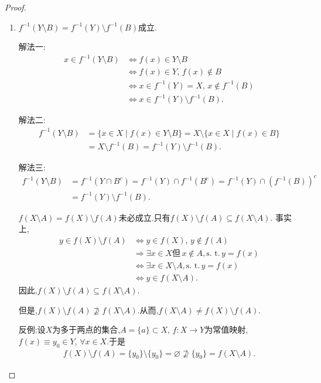 \documentclass[../../main.tex]{subfiles}%
\begin{document}
\begin{proof}
\begin{enumerate}[(1)]
反之, 假设 $f$ 不是单射, 则存在 $x_1 \neq x_2$ 使得 $f(x_1) = f(x_2)$. 构造集合 $A = \{x_1\}$, 则 $f(A) = \{f(x_1)\}$. 故 $\{x_1, x_2\} \subseteq f^{-1}(f(A))$, 从而 $A \neq f^{-1}(f(A))$. 矛盾. 

\item  $f^{-1}(Y \setminus B) = f^{-1}(Y) \setminus f^{-1}(B)$成立.

{\color{blue}解法一:}
\begin{align*}
x \in f^{-1}(Y \setminus B) &\iff  f(x) \in Y \setminus B \\
&\iff  f(x) \in Y, \, f(x) \notin B \\
&\iff  x \in f^{-1}(Y) = X, \, x \notin f^{-1}(B) \\
&\iff  x \in f^{-1}(Y) \setminus f^{-1}(B).
\end{align*}

{\color{blue}解法二:}
\begin{align*}
f^{-1}(Y \setminus B) &= \{x \in X \mid f(x) \in Y \setminus B\} = X \setminus \{x \in X \mid f(x) \in B\} \\
&= X \setminus f^{-1}(B) = f^{-1}(Y) \setminus f^{-1}(B).
\end{align*}

{\color{blue}解法三:}
\begin{align*}
f^{-1}(Y \setminus B) &= f^{-1}(Y \cap B^c) = f^{-1}(Y) \cap f^{-1}(B^c) = f^{-1}(Y) \cap (f^{-1}(B))^c \\
&= f^{-1}(Y) \setminus f^{-1}(B).
\end{align*}

$f(X \setminus A) = f(X) \setminus f(A)$未必成立.只有$f(X) \setminus f(A) \subseteq f(X \setminus A)$.
事实上,
\begin{align*}
y \in f(X) \setminus f(A) &\iff  y \in f(X), \, y \notin f(A) \\
&\Rightarrow \exists x \in X \text{但} \, x \notin A, \text{s. t.} \, y = f(x) \\
&\iff  \exists x \in X \setminus A, \text{s. t.} \, y = f(x) \\
&\iff  y \in f(X \setminus A).
\end{align*}
因此,$f(X) \setminus f(A) \subseteq f(X \setminus A)$.

但是,$f(X) \setminus f(A) \nsupseteq f(X \setminus A)$.从而,$f(X \setminus A) \neq f(X) \setminus f(A)$.

反例:设$X$为多于两点的集合,$A = \{a\} \subset X$, $f: X \to Y$为常值映射,$f(x) \equiv y_0 \in Y$, $\forall x \in X$.于是
\begin{align*}
f(X) \setminus f(A) = \{y_0\} \setminus \{y_0\} = \varnothing \nsupseteq \{y_0\} = f(X \setminus A).
\end{align*}
\end{enumerate}

\end{proof}
\end{document}
